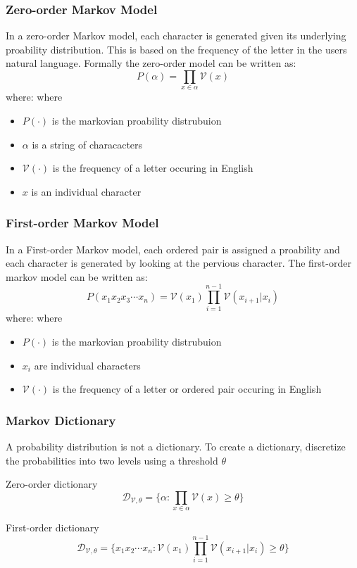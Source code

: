 \documentclass{beamer}
\newenvironment{where}{\noindent{}where\begin{itemize}}{\end{itemize}}
\begin{document}
\begin{frame}
\frametitle{Zero-order Markov Model}
In a zero-order Markov model, each character is generated given its underlying proability distribution. This is based on the frequency of the letter in the users natural language. Formally the zero-order model can be written as:
\begin{equation*}
P(\alpha) = \prod_{x \in \alpha} \mathcal{V}(x)
\end{equation*}
where:
\begin{where}
\item $P(\cdot)$ is the markovian proability distrubuion
\item $\alpha$ is a string of characacters
\item $\mathcal{V(\cdot)}$ is the frequency of a letter occuring in English
\item $x$ is an individual character
\end{where}
\end{frame}


\begin{frame}
\frametitle{First-order Markov Model}

In a First-order Markov model, each ordered pair is assigned a proability and each character is generated by looking at the pervious character. The first-order markov model can be written as:
\begin{equation*}
P(x_1x_2x_3 \dotsb x_n) = \mathcal{V}(x_1)\prod_{i=1}^{n-1}\mathcal{V}(x_{i+1}|x_i)
\end{equation*}
where:
\begin{where}
\item $P(\cdot)$ is the markovian proability distrubuion
\item $x_i$ are individual characters
\item $\mathcal{V(\cdot)}$ is the frequency of a letter or ordered pair occuring in English
\end{where}
\end{frame}



\begin{frame}
\frametitle{Markov Dictionary}
A probability distribution is not a dictionary. To create a dictionary, discretize the probabilities into two levels using a threshold $\theta$
\begin{block}{Zero-order dictionary}
\begin{equation*}
\mathcal{D}_{\mathcal{V},\theta} = \lbrace \alpha : \prod_{x \in \alpha}\mathcal{V}(x) \geq \theta \rbrace
\end{equation*}
\end{block}

\begin{block}{First-order dictionary}
\begin{equation*}
\mathcal{D}_{\mathcal{V},\theta} = \lbrace x_1x_2 \dotsb x_n : \mathcal{V}(x_1) \prod_{i = 1}^{n-1} \mathcal{V}(x_{i+1}|x_i) \geq \theta \rbrace
\end{equation*}
\end{block}
\end{frame}
\end{document}
